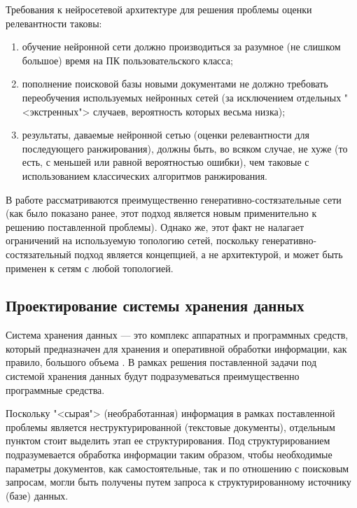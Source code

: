 Требования к нейросетевой архитектуре для решения проблемы оценки релевантности таковы:
\begin{enumerate}[1)]
    \item обучение нейронной сети должно производиться за разумное (не слишком большое) время на ПК пользовательского класса;
    \item пополнение поисковой базы новыми документами не должно требовать переобучения используемых нейронных сетей (за исключением отдельных 
          "<экстренных"> случаев, вероятность которых весьма низка);
    \item результаты, даваемые нейронной сетью (оценки релевантности для последующего ранжирования), должны быть, во всяком случае, не хуже 
          (то есть, с меньшей или равной вероятностью ошибки), чем таковые с использованием классических алгоритмов ранжирования.
\end{enumerate}

В работе рассматриваются преимущественно генеративно-состязательные сети (как было показано ранее, этот подход является новым применительно
к решению поставленной проблемы). Однако же, этот факт не налагает ограничений на используемую топологию сетей, поскольку генеративно-состязательный
подход является концепцией, а не архитектурой, и может быть применен к сетям с любой топологией.

\subsection{Проектирование системы хранения данных}
Система хранения данных --- это комплекс аппаратных и программных средств, который предназначен для хранения и оперативной обработки информации, 
как правило, большого объема \cite{datastorage}. В рамках решения поставленной задачи под системой хранения данных будут подразумеваться преимущественно
программные средства.

Поскольку "<сырая"> (необработанная) информация в рамках поставленной проблемы является неструктурированной (текстовые документы), отдельным
пунктом стоит выделить этап ее структурирования. Под структурированием подразумевается обработка информации таким образом, чтобы необходимые
параметры документов, как самостоятельные, так и по отношению с поисковым запросам, могли быть получены путем запроса к структурированному
источнику (базе) данных.

